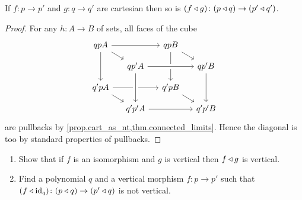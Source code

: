 \documentclass[DynamicalBook]{subfiles}
\begin{document}


\begin{proposition}\label{prop.comp_pres_cart}
If $f\colon p\to p'$ and $g\colon q\to q'$ are cartesian then so is $(f\mathbin{\triangleleft} g)\colon(p\mathbin{\triangleleft} q)\to (p'\mathbin{\triangleleft} q')$.
\end{proposition}
\begin{proof}
For any $h\colon A\to B$ of sets, all faces of the cube
\[
\begin{tikzcd}[sep=small]
  qpA\ar[rr]\ar[dd]\ar[dr]&&
  qpB\ar[dd]\ar[dr]\\&
  qp'A\ar[rr, crossing over]&&
  qp'B\ar[dd]\\
  q'pA\ar[rr]\ar[dr]&&
  q'pB\ar[dr]\\&
  q'p'A\ar[from=uu, crossing over]\ar[rr]&&
  q'p'B
\end{tikzcd}
\]
are pullbacks by \cref{prop.cart_as_nt,thm.connected_limits}. Hence the diagonal is too by standard properties of pullbacks.
\end{proof}

\begin{exercise}
\begin{enumerate}
	\item Show that if $f$ is an isomorphism and $g$ is vertical then $f\mathbin{\triangleleft} g$ is vertical.
	\item Find a polynomial $q$ and a vertical morphism $f\colon p\to p'$ such that $(f\mathbin{\triangleleft}\mathrm{id}_q)\colon (p\mathbin{\triangleleft} q)\to (p'\mathbin{\triangleleft} q)$ is not vertical.
\qedhere
\end{enumerate}
\end{exercise}
\end{document}
